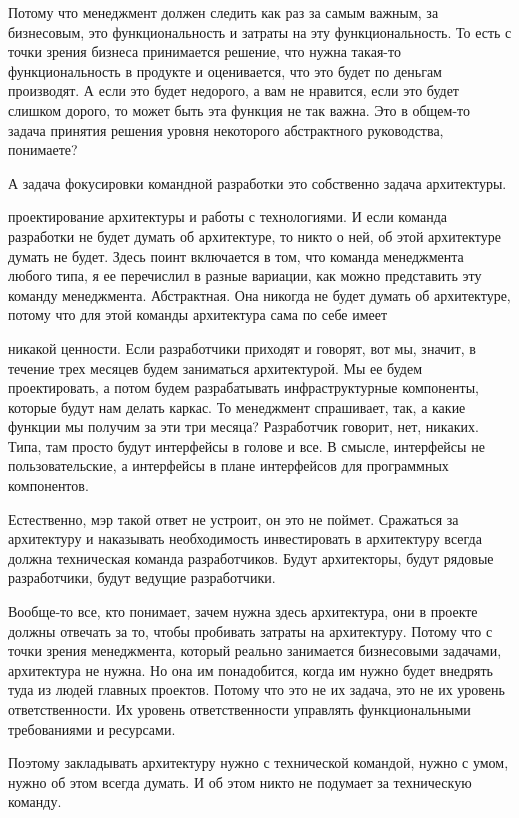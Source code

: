 Потому что менеджмент должен следить как раз за самым важным, за бизнесовым, это функциональность и затраты на эту функциональность. То есть с точки зрения бизнеса принимается решение, что нужна такая-то функциональность в продукте и оценивается, что это будет по деньгам производят. А если это будет недорого, а вам не нравится, если это будет слишком дорого, то может быть эта функция не так важна. Это в общем-то задача принятия решения уровня некоторого абстрактного руководства, понимаете?

А задача фокусировки командной разработки это собственно задача архитектуры.

проектирование архитектуры и работы с технологиями. И если команда разработки не будет думать об архитектуре, то никто о ней, об этой архитектуре думать не будет. Здесь поинт включается в том, что команда менеджмента любого типа, я ее перечислил в разные вариации, как можно представить эту команду менеджмента. Абстрактная. Она никогда не будет думать об архитектуре, потому что для этой команды архитектура сама по себе имеет

никакой ценности. Если разработчики приходят и говорят, вот мы, значит, в течение трех месяцев будем заниматься архитектурой. Мы ее будем проектировать, а потом будем разрабатывать инфраструктурные компоненты, которые будут нам делать каркас. То менеджмент спрашивает, так, а какие функции мы получим за эти три месяца? Разработчик говорит, нет, никаких. Типа, там просто будут интерфейсы в голове и все. В смысле, интерфейсы не пользовательские, а интерфейсы в плане интерфейсов для программных компонентов.

Естественно, мэр такой ответ не устроит, он это не поймет. Сражаться за архитектуру и наказывать необходимость инвестировать в архитектуру всегда должна техническая команда разработчиков. Будут архитекторы, будут рядовые разработчики, будут ведущие разработчики.

Вообще-то все, кто понимает, зачем нужна здесь архитектура, они в проекте должны отвечать за то, чтобы пробивать затраты на архитектуру. Потому что с точки зрения менеджмента, который реально занимается бизнесовыми задачами, архитектура не нужна. Но она им понадобится, когда им нужно будет внедрять туда из людей главных проектов. Потому что это не их задача, это не их уровень ответственности. Их уровень ответственности управлять функциональными требованиями и ресурсами.

Поэтому закладывать архитектуру нужно с технической командой, нужно с умом, нужно об этом всегда думать. И об этом никто не подумает за техническую команду.

